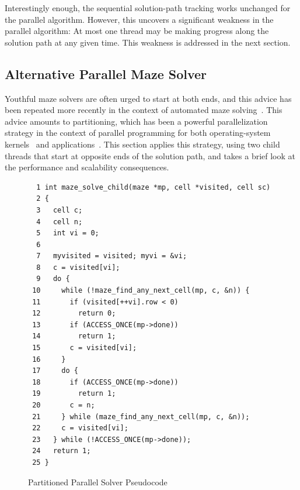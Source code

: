 Interestingly enough, the sequential solution-path tracking works unchanged
for the parallel algorithm.
However, this uncovers a significant weakness in the parallel algorithm:
At most one thread may be making progress along the solution path at
any given time.
This weakness is addressed in the next section.
\fi

\subsection{Alternative Parallel Maze Solver}
\label{sec:SMPdesign:Alternative Parallel Maze Solver}

Youthful maze solvers are often urged to start at both ends, and
this advice has been repeated more recently in the context of automated
maze solving~\cite{UMD:CMSC433maze}.
This advice amounts to partitioning, which has been a powerful
parallelization strategy
in the context of parallel programming for both operating-system
kernels~\cite{Beck85,Inman85} and
applications~\cite{DavidAPatterson2010TroubleMulticore}.
This section applies this strategy, using two child threads that start
at opposite ends of the solution path, and takes a brief look at the
performance and scalability consequences.

\begin{figure}[tbp]
{ \scriptsize
\begin{verbatim}
  1 int maze_solve_child(maze *mp, cell *visited, cell sc)
  2 {
  3   cell c;
  4   cell n;
  5   int vi = 0;
  6 
  7   myvisited = visited; myvi = &vi;
  8   c = visited[vi];
  9   do {
 10     while (!maze_find_any_next_cell(mp, c, &n)) {
 11       if (visited[++vi].row < 0)
 12         return 0;
 13       if (ACCESS_ONCE(mp->done))
 14         return 1;
 15       c = visited[vi];
 16     }
 17     do {
 18       if (ACCESS_ONCE(mp->done))
 19         return 1;
 20       c = n;
 21     } while (maze_find_any_next_cell(mp, c, &n));
 22     c = visited[vi];
 23   } while (!ACCESS_ONCE(mp->done));
 24   return 1;
 25 }
\end{verbatim}
}
\caption{Partitioned Parallel Solver Pseudocode}
\label{fig:SMPdesign:Partitioned Parallel Solver Pseudocode}
\end{figure}

